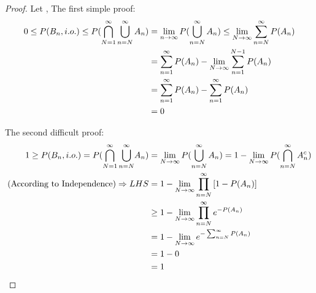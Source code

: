 \begin{proof}
    Let , The first simple proof:
    \begin{align*}
        0 \le P(B_n, i.o.) \le P(\bigcap_{N=1}^\infty\bigcup_{n=N}^\infty A_n) 
        & = \lim_{n\to \infty}{P(\bigcup_{n=N}^\infty A_n)} \le \lim_{N\to \infty}{\sum_{n=N}^{\infty}{P(A_n)}} \notag\\
        & = \sum_{n=1}^{\infty}{P(A_n)} -\lim_{N\to\infty}{\sum_{n=1}^{N-1}{P(A_n)} }\notag\\
        & = \sum_{n=1}^{\infty}{P(A_n)} - \sum_{n=1}^{\infty}{P(A_n)}   \notag\\
        & = 0                           
    \end{align*} 
    
    
    The second difficult proof:
    \begin{align*}
        1 \ge P(B_n, i.o.) = P(\bigcap_{N=1}^\infty{\bigcup_{n=N}^\infty}A_n) 
        & = \lim_{N\to \infty}{P(\bigcup_{n=N}^\infty A_n)} = 1 - \lim_{N\to \infty}{P(\bigcap_{n=N}^\infty A_n^c)}\notag\\
        \mbox{(According to Independence)}
        \Rightarrow LHS & = 1 - \lim_{N\to \infty}{\prod_{n=N}^\infty{[1- P(A_n)]}} \notag \\
        & \ge 1 - \lim_{N\to\infty}{\prod_{n=N}^\infty{{e}^{-P(A_n)}}} \notag \\
        & = 1 - \lim_{N\to \infty}{e^{-\sum_{n=N}^{\infty}{P(A_n)}}}\notag\\
        & = 1 - 0\notag\\
        & = 1
    \end{align*}
\end{proof}